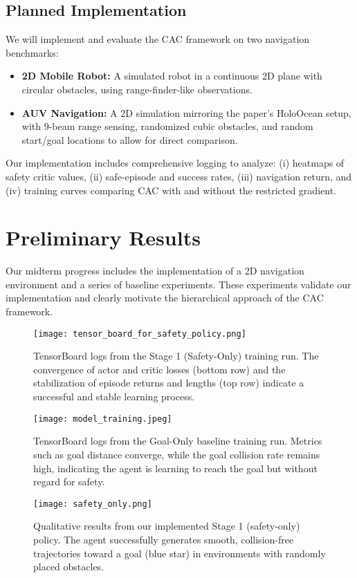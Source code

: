 \documentclass[10pt,conference]{IEEEtran}
\begin{document}
\subsection{Planned Implementation}
We will implement and evaluate the CAC framework on two navigation benchmarks:
\begin{itemize}
    \item \textbf{2D Mobile Robot:} A simulated robot in a continuous 2D plane with circular obstacles, using range-finder-like observations.
    \item \textbf{AUV Navigation:} A 2D simulation mirroring the paper’s HoloOcean setup, with 9-beam range sensing, randomized cubic obstacles, and random start/goal locations to allow for direct comparison.
\end{itemize}
Our implementation includes comprehensive logging to analyze: (i) heatmaps of safety critic values, (ii) safe-episode and success rates, (iii) navigation return, and (iv) training curves comparing CAC with and without the restricted gradient.

\section{Preliminary Results}
Our midterm progress includes the implementation of a 2D navigation environment and a series of baseline experiments. These experiments validate our implementation and clearly motivate the hierarchical approach of the CAC framework.

\begin{figure}[h!]
    \centering
    \texttt{[image: tensor\_board\_for\_safety\_policy.png]}
    \caption{TensorBoard logs from the Stage 1 (Safety-Only) training run. The convergence of actor and critic losses (bottom row) and the stabilization of episode returns and lengths (top row) indicate a successful and stable learning process.}
    \label{fig:safety_training}
\end{figure}

\begin{figure}[h!]
    \centering
    \texttt{[image: model\_training.jpeg]}
    \caption{TensorBoard logs from the Goal-Only baseline training run. Metrics such as goal distance converge, while the goal collision rate remains high, indicating the agent is learning to reach the goal but without regard for safety.}
    \label{fig:goal_training}
\end{figure}

\begin{figure}[h!]
    \centering
    \texttt{[image: safety\_only.png]}
    \caption{Qualitative results from our implemented Stage 1 (safety-only) policy. The agent successfully generates smooth, collision-free trajectories toward a goal (blue star) in environments with randomly placed obstacles.}
    \label{fig:safety_only}
\end{figure}
\end{document}

